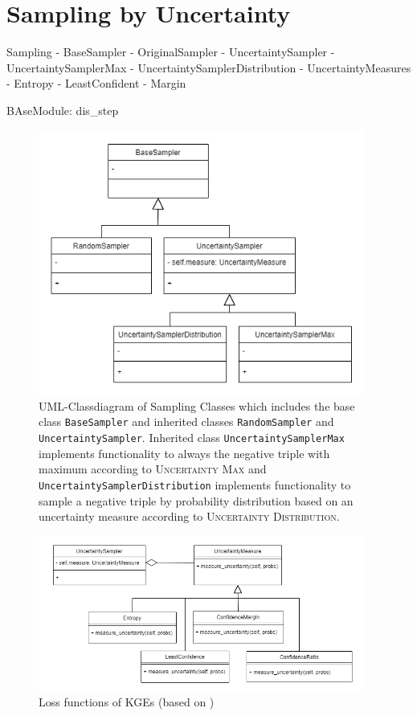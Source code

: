  \section{Sampling by Uncertainty}
 \label{sec:sampling_by_uncertainty}
 
 
 
Sampling
- BaseSampler
- OriginalSampler
- UncertaintySampler
    - UncertaintySamplerMax
    - UncertaintySamplerDistribution
- UncertaintyMeasures
    - Entropy
    - LeastConfident
    - Margin

BAseModule: dis\_step



\begin{figure}[t]
  \centering
    \includegraphics[width=0.95\textwidth]{figures/classdiagrams/SamplingClasses.png}
  \caption{\ac{UML}-Classdiagram of Sampling Classes which includes the base class \texttt{BaseSampler} and inherited classes \texttt{RandomSampler} and \texttt{UncertaintySampler}.
  Inherited class \texttt{UncertaintySamplerMax} implements functionality to always the negative triple with maximum according to \textsc{Uncertainty Max} and \texttt{UncertaintySamplerDistribution} implements functionality to sample a negative triple by probability distribution based on an uncertainty measure according to \textsc{Uncertainty Distribution}.}
  \label{fig:sampling_classdiagramm}
\end{figure}


\begin{figure}[t]
  \centering
    \includegraphics[width=0.95\textwidth]{figures/classdiagrams/UncertaintyMeasures.png}
  \caption{Loss functions of \acp{KGE} (based on \cite{9207513})}
  \label{fig:uncertainty_measures}
\end{figure}
